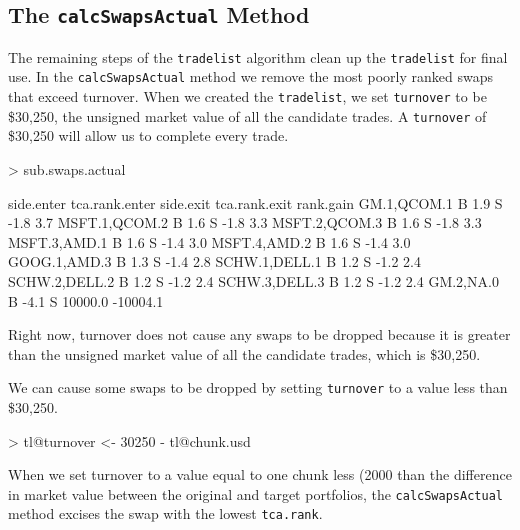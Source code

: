 \documentclass{article}
\begin{document}
\subsection{The \texttt{calcSwapsActual} Method}
\label{calcSwapsActual}

The remaining steps of the \texttt{tradelist} algorithm clean up the
\texttt{tradelist} for final use.  In the \texttt{calcSwapsActual}
method we remove the most poorly ranked swaps that exceed turnover.
When we created the \texttt{tradelist}, we set \texttt{turnover} to be
\$30,250, the unsigned market
value of all the candidate trades.  A \texttt{turnover} of
\$30,250 will allow us to
complete every trade.


\begin{Schunk}
\begin{Sinput}
> sub.swaps.actual
\end{Sinput}
\begin{Soutput}
              side.enter tca.rank.enter side.exit tca.rank.exit rank.gain
GM.1,QCOM.1            B            1.9         S          -1.8       3.7
MSFT.1,QCOM.2          B            1.6         S          -1.8       3.3
MSFT.2,QCOM.3          B            1.6         S          -1.8       3.3
MSFT.3,AMD.1           B            1.6         S          -1.4       3.0
MSFT.4,AMD.2           B            1.6         S          -1.4       3.0
GOOG.1,AMD.3           B            1.3         S          -1.4       2.8
SCHW.1,DELL.1          B            1.2         S          -1.2       2.4
SCHW.2,DELL.2          B            1.2         S          -1.2       2.4
SCHW.3,DELL.3          B            1.2         S          -1.2       2.4
GM.2,NA.0              B           -4.1         S       10000.0  -10004.1
\end{Soutput}
\end{Schunk}

Right now, turnover does not cause any swaps to be dropped because it
is greater than the unsigned market value of all the candidate trades,
which is \$30,250.
  
We can cause some swaps to be dropped by setting \texttt{turnover} to
a value less than \$30,250.


\begin{Schunk}
\begin{Sinput}
> tl@turnover <- 30250 - tl@chunk.usd
\end{Sinput}
\end{Schunk}


When we set turnover to a value equal to one chunk less
(2000 than the difference in market value between the
original and target portfolios, the \texttt{calcSwapsActual} method
excises the swap with the lowest \texttt{tca.rank}.
\end{document}
